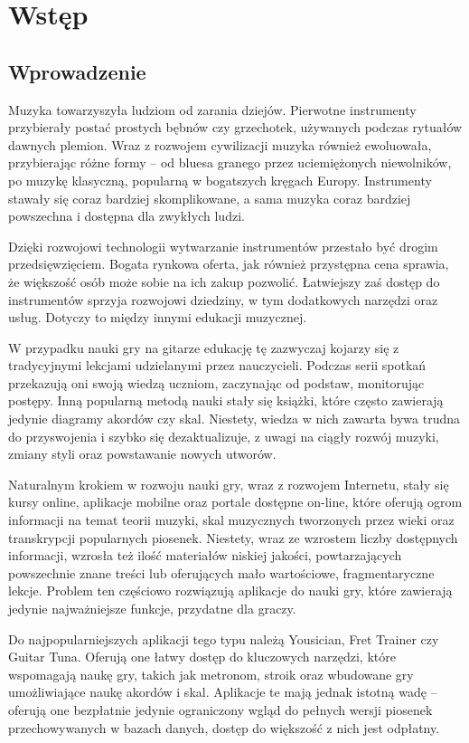 \chapter{Wstęp}

\section{Wprowadzenie}
Muzyka towarzyszyła ludziom od zarania dziejów. Pierwotne instrumenty przybierały postać prostych bębnów czy grzechotek, używanych podczas rytuałów dawnych plemion. Wraz z rozwojem cywilizacji muzyka również ewoluowała, przybierając różne formy – od bluesa granego przez uciemiężonych niewolników, po muzykę klasyczną, popularną w bogatszych kręgach Europy. Instrumenty stawały się coraz bardziej skomplikowane, a sama muzyka coraz bardziej powszechna i dostępna dla zwykłych ludzi.

Dzięki rozwojowi technologii wytwarzanie instrumentów przestało być drogim przedsięwzięciem. Bogata rynkowa oferta, jak również przystępna cena sprawia, że większość osób może sobie na ich zakup pozwolić. Łatwiejszy zaś dostęp do instrumentów sprzyja rozwojowi dziedziny, w tym dodatkowych narzędzi oraz usług.
Dotyczy to między innymi edukacji muzycznej.

W przypadku nauki gry na gitarze edukację tę zazwyczaj kojarzy się z tradycyjnymi lekcjami udzielanymi przez nauczycieli. Podczas serii spotkań przekazują oni swoją wiedzą uczniom, zaczynając od podstaw, monitorując postępy. Inną popularną metodą nauki stały się książki, które często zawierają jedynie diagramy akordów czy skal. Niestety, wiedza w nich zawarta bywa trudna do przyswojenia i szybko się dezaktualizuje, z uwagi na ciągły rozwój muzyki, zmiany styli oraz powstawanie nowych utworów.

Naturalnym krokiem w rozwoju nauki gry, wraz z rozwojem Internetu, stały się kursy online, aplikacje mobilne oraz portale dostępne on-line, które oferują ogrom informacji na temat teorii muzyki, skal muzycznych tworzonych przez wieki oraz transkrypcji popularnych piosenek. Niestety, wraz ze wzrostem liczby dostępnych informacji, wzrosła też ilość materiałów niskiej jakości, powtarzających powszechnie znane treści lub oferujących mało wartościowe, fragmentaryczne lekcje. Problem ten częściowo rozwiązują aplikacje do nauki gry, które zawierają jedynie najważniejsze funkcje, przydatne dla graczy.

Do najpopularniejszych aplikacji tego typu należą Yousician, Fret Trainer czy Guitar Tuna. Oferują one łatwy dostęp do kluczowych narzędzi, które wspomagają naukę gry, takich jak metronom, stroik oraz wbudowane gry umożliwiające naukę akordów i skal. Aplikacje te mają jednak istotną wadę – oferują one bezpłatnie jedynie ograniczony wgląd do pełnych wersji piosenek przechowywanych w bazach danych, dostęp do większość z nich jest odpłatny.

